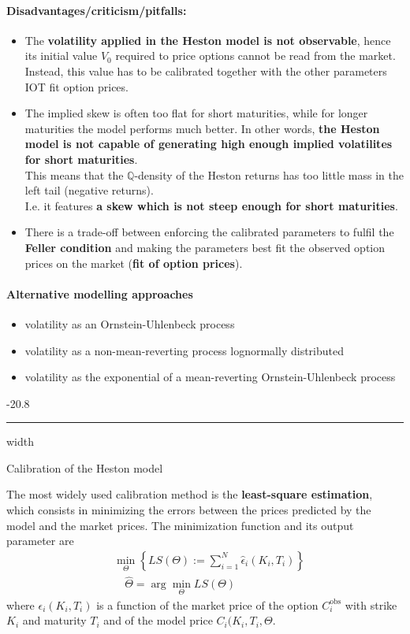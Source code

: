 \documentclass[a4paper,landscape,7pt,fleqn]{scrartcl}
\makeatletter
\renewcommand{\emph}[1]{\textbf{#1}}
\renewcommand{\subsubsection}{\@startsection{subsubsection}{1}{0mm}%
{-2\baselineskip}{0.8\baselineskip}%
{\hrule depth 0.2pt width\columnwidth\vspace*{1.2em}\normalsize\bfseries}}
\makeatother
\begin{document}
\begin{multicols*}{3}
\paragraph{Disadvantages/criticism/pitfalls:}
\begin{itemize}
\item The \emph{volatility applied in the Heston model is not observable}, hence its initial value $V_0$ required to price options cannot be read from the market. \\
Instead, this value has to be calibrated together with the other parameters IOT fit option prices.
\item The implied skew is often too flat for short maturities, while for longer maturities the model performs much better. In other words, \emph{the Heston model is not capable of generating high enough implied volatilites for short maturities}. \\
This means that the $\mathbb{Q}$-density of the Heston returns has too little mass in the left tail (negative returns). \\
I.e. it features \emph{a skew which is not steep enough for short maturities}.
\item There is a trade-off between enforcing the calibrated parameters to fulfil the \emph{Feller condition} and making the parameters best fit the observed option prices on the market (\emph{fit of option prices}).
\end{itemize}

\paragraph{Alternative modelling approaches}
\begin{itemize}
\item volatility as an Ornstein-Uhlenbeck process
\item volatility as a non-mean-reverting process lognormally distributed
\item volatility as the exponential of a mean-reverting Ornstein-Uhlenbeck process
\end{itemize}

\subsubsection{Calibration of the Heston model}

The most widely used calibration method is the \emph{least-square estimation}, which consists in minimizing the errors between the prices predicted by the model and the market prices. The minimization function and its output parameter are
\begin{align*}
& \min\limits_{\Theta} \left\lbrace LS(\Theta) := \sum_{i=1}^N \hat \epsilon_i (K_i,T_i) \right\rbrace \\
& \quad \hat \Theta = \arg \min_\Theta LS(\Theta)
\end{align*}
where $\epsilon_i (K_i,T_i)$ is a function of the market price of the option $C_i^\text{obs}$ with strike $K_i$ and maturity $T_i$ and of the model price $C_i(K_i,T_i,\Theta$.


\end{multicols*}
\end{document}
